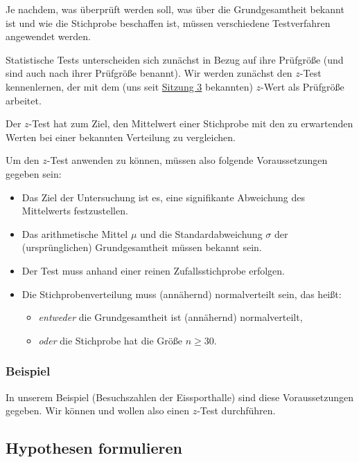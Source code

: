 \documentclass[
  11pt,
  ngerman,
  a4paper,
]{report}
\providecommand{\tightlist}{%
  \setlength{\itemsep}{0pt}\setlength{\parskip}{0pt}}
\begin{document}
Je nachdem, was überprüft werden soll, was über die Grundgesamtheit bekannt ist und wie die Stichprobe beschaffen ist, müssen verschiedene Testverfahren angewendet werden.

Statistische Tests unterscheiden sich zunächst in Bezug auf ihre Prüfgröße (und sind auch nach ihrer Prüfgröße benannt). Wir werden zunächst den \(z\)-Test kennenlernen, der mit dem (uns seit \protect\hyperlink{z-transformation}{Sitzung 3} bekannten) \(z\)-Wert als Prüfgröße arbeitet.

Der \(z\)-Test hat zum Ziel, den Mittelwert einer Stichprobe mit den zu erwartenden Werten bei einer bekannten Verteilung zu vergleichen.

Um den \(z\)-Test anwenden zu können, müssen also folgende Voraussetzungen gegeben sein:

\begin{itemize}
\tightlist
\item
  Das Ziel der Untersuchung ist es, eine signifikante Abweichung des Mittelwerts festzustellen.
\item
  Das arithmetische Mittel \(\mu\) und die Standardabweichung \(\sigma\) der (ursprünglichen) Grundgesamtheit müssen bekannt sein.
\item
  Der Test muss anhand einer reinen Zufallsstichprobe erfolgen.
\item
  Die Stichprobenverteilung muss (annähernd) normalverteilt sein, das heißt:

  \begin{itemize}
  \tightlist
  \item
    \emph{entweder} die Grundgesamtheit ist (annähernd) normalverteilt,
  \item
    \emph{oder} die Stichprobe hat die Größe \(n\geq30\).
  \end{itemize}
\end{itemize}

\hypertarget{beispiel}{%
\subsubsection{Beispiel}\label{beispiel}}

In unserem Beispiel (Besuchszahlen der Eissporthalle) sind diese Voraussetzungen gegeben. Wir können und wollen also einen \(z\)-Test durchführen.

\hypertarget{hypothesen-formulieren}{%
\subsection{Hypothesen formulieren}\label{hypothesen-formulieren}}
\end{document}
